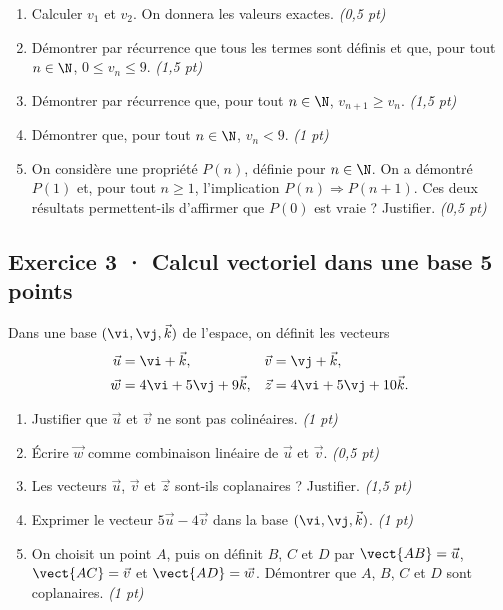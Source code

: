\begin{enumerate}

\item Calculer $v_1$ et $v_2$. On donnera les valeurs exactes. \hfill\textit{(0,5 pt)}

\item Démontrer par récurrence que tous les termes sont définis et que, pour tout $n\in\N$, $0\le v_n\le9$. \hfill\textit{(1,5 pt)}

\item Démontrer par récurrence que, pour tout $n\in\N$, $v_{n+1}\ge v_n$. \hfill\textit{(1,5 pt)}

\item Démontrer que, pour tout $n\in\N$, $v_n<9$. \hfill\textit{(1 pt)}

\item On considère une propriété $P(n)$, définie pour $n\in\N$. On a démontré $P(1)$ et, pour tout $n\ge1$, l'implication $P(n)\Rightarrow P(n+1)$. Ces deux résultats permettent-ils d'affirmer que $P(0)$ est vraie ? Justifier. \hfill\textit{(0,5 pt)}

\end{enumerate}

\clearpage{}\par

\subsection*{Exercice 3 · Calcul vectoriel dans une base \hfill 5 points}Dans une base $(\vi,\vj,\vec k)$ de l'espace, on définit les vecteurs
\[\begin{aligned}\vec u&=\vi+\vec k,&\vec v&=\vj+\vec k,\\
\vec w&=4\vi+5\vj+9\vec k,&\vec z&=4\vi+5\vj+10\vec k.\end{aligned}\]

\begin{enumerate}

\item Justifier que $\vec u$ et $\vec v$ ne sont pas colinéaires. \hfill\textit{(1 pt)}

\item Écrire $\vec w$ comme combinaison linéaire de $\vec u$ et $\vec v$. \hfill\textit{(0,5 pt)}

\item Les vecteurs $\vec u$, $\vec v$ et $\vec z$ sont-ils coplanaires ? Justifier. \hfill\textit{(1,5 pt)}

\item Exprimer le vecteur $5\vec u-4\vec v$ dans la base $(\vi,\vj,\vec k)$. \hfill\textit{(1 pt)}

\item On choisit un point $A$, puis on définit $B$, $C$ et $D$ par $\vect{AB}=\vec u$, $\vect{AC}=\vec v$ et $\vect{AD}=\vec w$. Démontrer que $A$, $B$, $C$ et $D$ sont coplanaires. \hfill\textit{(1 pt)}

\end{enumerate}

